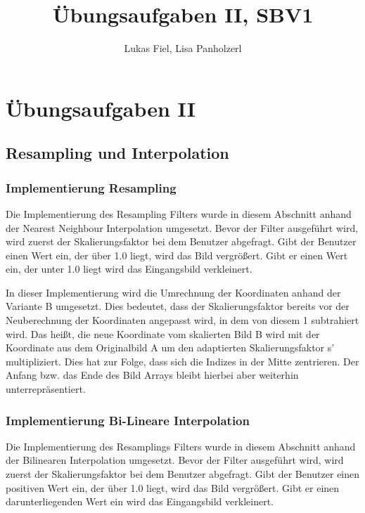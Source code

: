 \documentclass[12pt,german]{article}
\begin{document}
\title{Übungsaufgaben II, SBV1 }
\author{Lukas Fiel, Lisa Panholzerl}
\maketitle


\newpage
\section{Übungsaufgaben II}
\subsection{Resampling und Interpolation}
\subsubsection{Implementierung Resampling}
Die Implementierung des Resampling Filters wurde in diesem Abschnitt anhand der Nearest Neighbour Interpolation umgesetzt. Bevor der Filter ausgeführt wird, wird zuerst der Skalierungsfaktor bei dem Benutzer abgefragt. Gibt der Benutzer einen Wert ein, der über 1.0 liegt, wird das Bild vergrößert. Gibt er einen Wert ein, der unter 1.0 liegt wird das Eingangsbild verkleinert.

In dieser Implementierung wird die Umrechnung der Koordinaten anhand der Variante B umgesetzt. Dies bedeutet, dass der Skalierungsfaktor bereits vor der Neuberechnung der Koordinaten angepasst wird, in dem von diesem 1 subtrahiert wird. Das heißt, die neue Koordinate vom skalierten Bild B wird mit der Koordinate aus dem Originalbild A um den adaptierten Skalierungsfaktor s' multipliziert. Dies hat zur Folge, dass sich die Indizes in der Mitte zentrieren. Der Anfang bzw. das Ende des Bild Arrays bleibt hierbei aber weiterhin unterrepräsentiert.\\



\subsubsection{Implementierung Bi-Lineare Interpolation}
Die Implementierung des Resamplings Filters wurde in diesem Abschnitt anhand der Bilinearen Interpolation umgesetzt. Bevor der Filter ausgeführt wird, wird zuerst der Skalierungsfaktor bei dem Benutzer abgefragt. Gibt der Benutzer einen positiven Wert ein, der über 1.0 liegt, wird das Bild vergrößert. Gibt er einen darunterliegenden Wert ein wird das Eingangsbild verkleinert.
\end{document}
